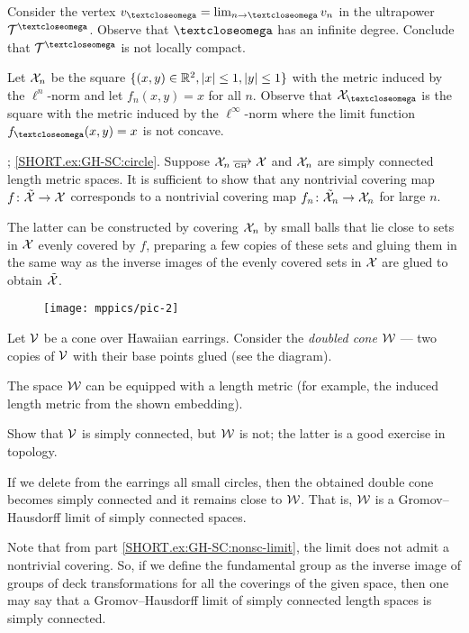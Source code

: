 Consider the vertex $v_\o=\lim_{n\to\o}v_n$ in the ultrapower $\spc{T}^\o$.
Observe that $\o$ has an infinite degree.
Conclude that $\spc{T}^\o$ is not locally compact.

Let $\mathcal{X}_n$ be the square $\{( x,y)\in \R^2, |x|\le 1, |y|\le 1\}$ with the metric induced by the $\ell^n$-norm and let $f_n(x,y)=x$ for all $n$.
Observe that $\spc{X}_\o$ is the square with the metric induced by the $\ell^\infty$-norm where the limit function $f_\o(x,y)=x$ is not concave.

\parbf{\ref{ex:GH-SC}}; \ref{SHORT.ex:GH-SC:circle}.
Suppose $\spc{X}_n\GHto \spc{X}$ and $\mathcal{X}_n$ are simply connected length metric spaces.
It is sufficient to show that any nontrivial covering map $f\:\tilde{\spc{X}}\to \spc{X}$ corresponds to a nontrivial covering map $f_n\:\tilde{\spc{X}}_n\to \spc{X}_n$ for large $n$.

The latter can be constructed by covering $\mathcal{X}_n$ by small balls that lie close to sets in $\mathcal{X}$ evenly covered by $f$, preparing a few copies of these sets and gluing them in the same way as the inverse images of the evenly covered sets in $\mathcal{X}$ are glued to obtain $\tilde{\mathcal{X}}$.

\begin{wrapfigure}{r}{43 mm}
\vskip-8mm
\centering
\texttt{[image: mppics/pic-2]}
\end{wrapfigure}

Let $\mathcal{V}$ be a cone over Hawaiian earrings.
Consider the {}\emph{doubled cone} $\mathcal{W}$ --- two copies of $\mathcal{V}$ with  their base points glued (see the diagram).

The space $\mathcal{W}$ can be equipped with a length metric
(for example, the induced length metric from the shown embedding).

Show that $\mathcal{V}$ is simply connected, but $\mathcal{W}$ is not; the latter is a good exercise in topology.

If we delete from the earrings all small circles, then the obtained double cone becomes simply connected and it remains close to $\mathcal{W}$.
That is, $\mathcal{W}$ is a Gromov--Hausdorff limit of simply connected spaces.

Note that from part \ref{SHORT.ex:GH-SC:nonsc-limit}, the limit does not admit a nontrivial covering.
So, if we define the fundamental group as the inverse image of groups of deck transformations for all the coverings of the given space, then one may say that a Gromov--Hausdorff limit of simply connected length spaces is simply connected.

